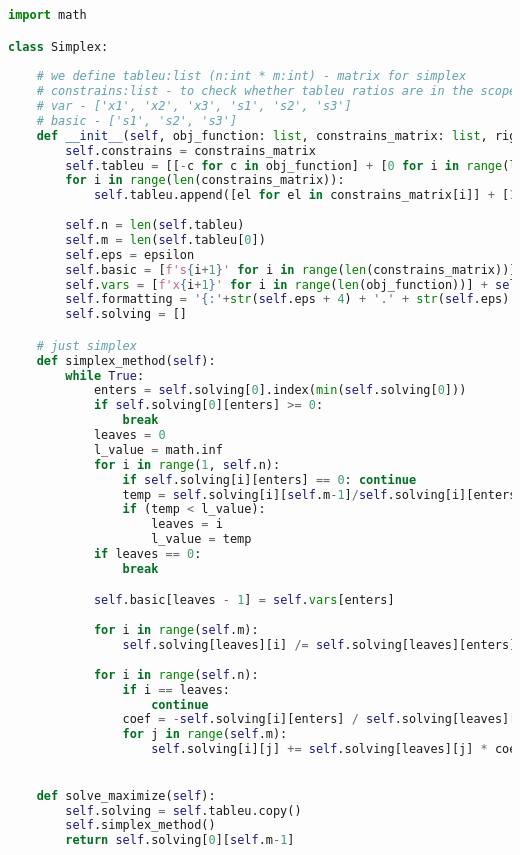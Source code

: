 \documentclass[12pt, legalpaper]{exam}
\begin{document}
\begin{lstlisting}[language=Python, caption=Программа на Python, label=lst:python-code]
import math

class Simplex:
    
    # we define tableu:list (n:int * m:int) - matrix for simplex
    # constrains:list - to check whether tableu ratios are in the scope of them
    # var - ['x1', 'x2', 'x3', 's1', 's2', 's3']
    # basic - ['s1', 's2', 's3']
    def __init__(self, obj_function: list, constrains_matrix: list, right_hand_side_num: list, epsilon:int):
        self.constrains = constrains_matrix
        self.tableu = [[-c for c in obj_function] + [0 for i in range(len(constrains_matrix))] + [0]]
        for i in range(len(constrains_matrix)):
            self.tableu.append([el for el in constrains_matrix[i]] + [1 if i == j else 0 for j in range(len(constrains_matrix))] + [right_hand_side_num[i]])
        
        self.n = len(self.tableu)
        self.m = len(self.tableu[0])
        self.eps = epsilon
        self.basic = [f's{i+1}' for i in range(len(constrains_matrix))]
        self.vars = [f'x{i+1}' for i in range(len(obj_function))] + self.basic
        self.formatting = '{:'+str(self.eps + 4) + '.' + str(self.eps) + 'f}'
        self.solving = []

    # just simplex 
    def simplex_method(self):
        while True:
            enters = self.solving[0].index(min(self.solving[0]))
            if self.solving[0][enters] >= 0:
                break
            leaves = 0
            l_value = math.inf
            for i in range(1, self.n):
                if self.solving[i][enters] == 0: continue
                temp = self.solving[i][self.m-1]/self.solving[i][enters]
                if (temp < l_value):
                    leaves = i
                    l_value = temp
            if leaves == 0:
                break

            self.basic[leaves - 1] = self.vars[enters]
            
            for i in range(self.m):
                self.solving[leaves][i] /= self.solving[leaves][enters]
        
            for i in range(self.n):
                if i == leaves:
                    continue
                coef = -self.solving[i][enters] / self.solving[leaves][enters]
                for j in range(self.m):
                    self.solving[i][j] += self.solving[leaves][j] * coef

    
    def solve_maximize(self):
        self.solving = self.tableu.copy()
        self.simplex_method()
        return self.solving[0][self.m-1]
        

\end{lstlisting}
\end{document}
